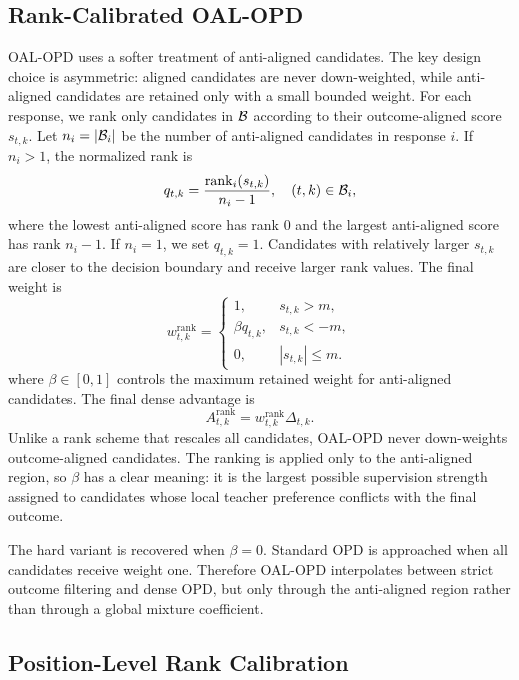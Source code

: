 \documentclass[letterpaper]{article} %
\begin{document}
\subsection{Rank-Calibrated OAL-OPD}

OAL-OPD uses a softer treatment of anti-aligned candidates. The key design choice is asymmetric: aligned candidates are never down-weighted, while anti-aligned candidates are retained only with a small bounded weight. For each response, we rank only candidates in ${\cal B}$ according to their outcome-aligned score $s_{t,k}$. Let $n_i=|{\cal B}_i|$ be the number of anti-aligned candidates in response $i$. If $n_i>1$, the normalized rank is
\begin{equation}
q_{t,k}
=
\frac{\mathrm{rank}_{i}(s_{t,k})}{n_i-1},
\quad (t,k)\in{\cal B}_i,
\end{equation}
where the lowest anti-aligned score has rank $0$ and the largest anti-aligned score has rank $n_i-1$. If $n_i=1$, we set $q_{t,k}=1$. Candidates with relatively larger $s_{t,k}$ are closer to the decision boundary and receive larger rank values. The final weight is
\begin{equation}
w^{\mathrm{rank}}_{t,k}
=
\left\{
\begin{array}{ll}
1, & s_{t,k}>m,\\
\beta q_{t,k}, & s_{t,k}<-m,\\
0, & |s_{t,k}|\leq m.
\end{array}
\right.
\end{equation}
where $\beta \in [0,1]$ controls the maximum retained weight for anti-aligned candidates. The final dense advantage is
\begin{equation}
A^{\mathrm{rank}}_{t,k}
=
w^{\mathrm{rank}}_{t,k}\Delta_{t,k}.
\end{equation}
Unlike a rank scheme that rescales all candidates, OAL-OPD never down-weights outcome-aligned candidates. The ranking is applied only to the anti-aligned region, so $\beta$ has a clear meaning: it is the largest possible supervision strength assigned to candidates whose local teacher preference conflicts with the final outcome.

The hard variant is recovered when $\beta=0$. Standard OPD is approached when all candidates receive weight one. Therefore OAL-OPD interpolates between strict outcome filtering and dense OPD, but only through the anti-aligned region rather than through a global mixture coefficient.

\subsection{Position-Level Rank Calibration}
\end{document}
